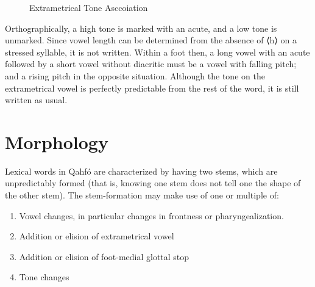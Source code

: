 \documentclass{article}
\newcommand{\orth}[1]{{\lib{}⟨}#1{\lib{}⟩}}
\newcommand{\langname}{Qahfó}
\begin{document}
\begin{figure}[H]
\caption{Extrametrical Tone Asccoiation}
\label{toneassoc2}
\end{figure}

Orthographically, a high tone is marked with an acute, and a low tone is unmarked. Since vowel length can be determined from the absence of \orth{h} on a stressed syllable, it is not written. Within a foot then, a long vowel with an acute followed by a short vowel without diacritic must be a vowel with falling pitch; and a rising pitch in the opposite situation. Although the tone on the extrametrical vowel is perfectly predictable from the rest of the word, it is still written as usual.


\newpage
\section{Morphology}
Lexical words in \langname{} are characterized by having two stems, which are unpredictably formed (that is, knowing one stem does not tell one the shape of the other stem). The stem-formation may make use of one or multiple of:
\begin{enumerate}
\item Vowel changes, in particular changes in frontness or pharyngealization.
\item Addition or elision of extrametrical vowel
\item Addition or elision of foot-medial glottal stop
\item Tone changes
\end{enumerate}
\end{document}
